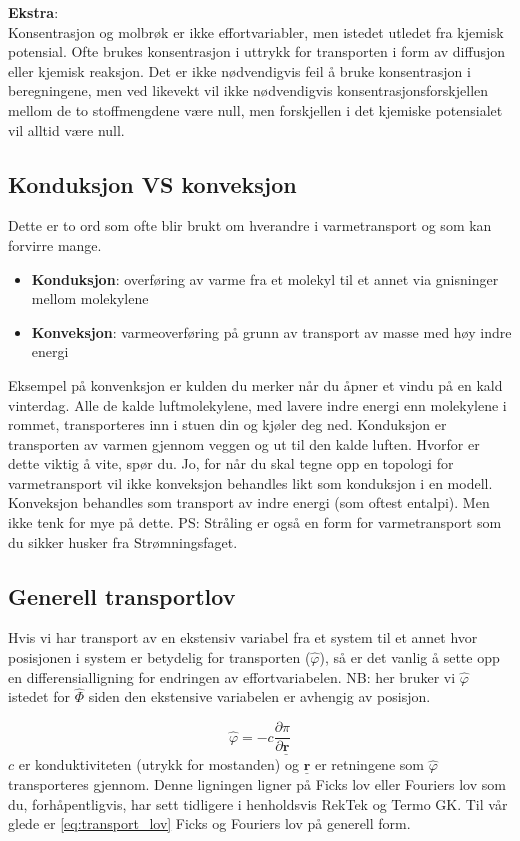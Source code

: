 \textbf{Ekstra}:\\ 
Konsentrasjon og molbrøk er ikke effortvariabler, men istedet utledet fra kjemisk potensial. Ofte brukes konsentrasjon i uttrykk for transporten i form av diffusjon eller kjemisk reaksjon. Det er ikke nødvendigvis feil å bruke konsentrasjon i beregningene, men ved likevekt vil ikke nødvendigvis konsentrasjonsforskjellen mellom de to stoffmengdene være null, men forskjellen i det kjemiske potensialet vil alltid være null.  

\subsection{Konduksjon VS konveksjon}\label{sec:konveksjon_konduksjon}
Dette er to ord som ofte blir brukt om hverandre i varmetransport og som kan forvirre mange. 

\begin{itemize}
    \item \textbf{Konduksjon}: overføring av varme fra et molekyl til et annet via gnisninger mellom molekylene
    \item \textbf{Konveksjon}: varmeoverføring på grunn av transport av masse med høy indre energi
\end{itemize}
Eksempel på konvenksjon er kulden du merker når du åpner et vindu på en kald vinterdag. Alle de kalde luftmolekylene, med lavere indre energi enn molekylene i rommet, transporteres inn i stuen din og kjøler deg ned. Konduksjon er transporten av varmen gjennom veggen og ut til den kalde luften. Hvorfor er dette viktig å vite, spør du. Jo, for når du skal tegne opp en topologi for varmetransport vil ikke konveksjon behandles likt som konduksjon i en modell. Konveksjon behandles som transport av indre energi (som oftest entalpi). Men ikke tenk for mye på dette. PS: Stråling er også en form for varmetransport som du sikker husker fra Strømningsfaget. 

\subsection{Generell transportlov}
Hvis vi har transport av en ekstensiv variabel fra et system til et annet hvor posisjonen i system er betydelig for transporten ($\hat{\varphi}$), så er det vanlig å sette opp en differensialligning for endringen av effortvariabelen. NB: her bruker vi $\hat{\varphi}$ istedet for $\hat{\Phi}$ siden den ekstensive variabelen er avhengig av posisjon.

\begin{equation}
    \label{eq:transport_lov}
    \hat{\varphi} = -c\frac{\partial \pi}{\partial \underline{\textbf{r}}}
\end{equation}
$c$ er konduktiviteten (utrykk for mostanden) og $\underline{\textbf{r}}$ er retningene som $\hat{\varphi}$ transporteres gjennom. Denne ligningen ligner på Ficks lov eller Fouriers lov som du, forhåpentligvis, har sett tidligere i henholdsvis RekTek og Termo GK. Til vår glede er \cref{eq:transport_lov} Ficks og Fouriers lov på generell form. 


